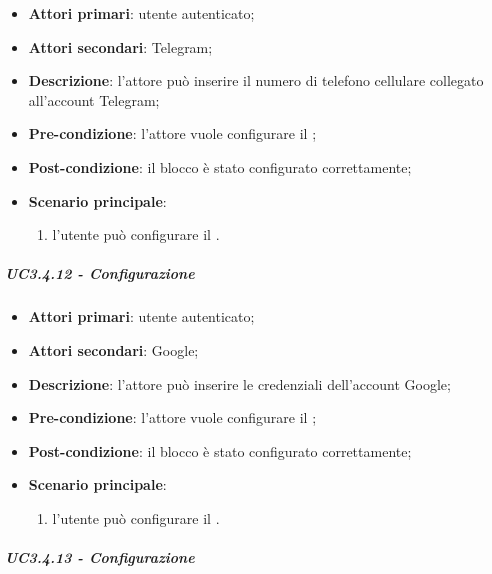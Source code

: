 \begin{itemize}
\item \textbf{Attori primari}: utente autenticato;

\item \textbf{Attori secondari}: Telegram;

\item \textbf{Descrizione}: l'attore può inserire il numero di telefono cellulare collegato all'account Telegram;

\item \textbf{Pre-condizione}: l'attore vuole configurare il \BTelegram{};

\item \textbf{Post-condizione}:  il blocco è stato configurato correttamente;

\item \textbf{Scenario principale}:
\begin{enumerate}
\item  l'utente può configurare il \BTelegram{}.

\end{enumerate}
\end{itemize}

\subparagraph{UC3.4.12 - Configurazione \BMail{}}

\begin{itemize}
\item \textbf{Attori primari}: utente autenticato;

\item \textbf{Attori secondari}: Google;

\item \textbf{Descrizione}: l'attore può inserire le credenziali dell'account Google;

\item \textbf{Pre-condizione}: l'attore vuole configurare il \BMail{};

\item \textbf{Post-condizione}:  il blocco è stato configurato correttamente;

\item \textbf{Scenario principale}:
\begin{enumerate}
\item  l'utente può configurare il \BMail{}.

\end{enumerate}
\end{itemize}

\subparagraph{UC3.4.13 - Configurazione \BCalendario{}}

